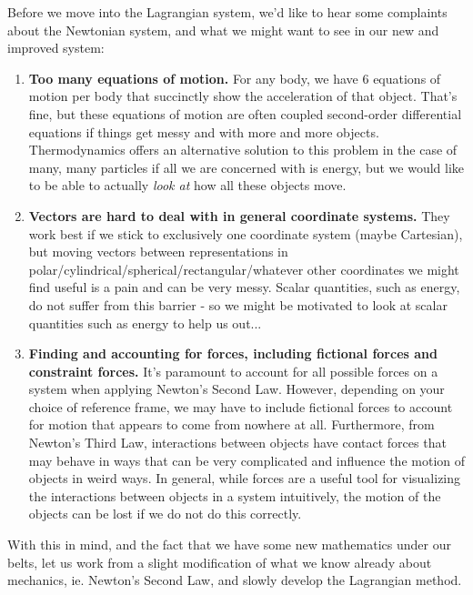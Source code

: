 Before we move into the Lagrangian system, we'd like to hear some complaints about the Newtonian system, and what we might want to see in our new and improved system: 
\begin{enumerate}
\item \textbf{Too many equations of motion.} For any body, we have $6$ equations of motion per body that succinctly show the acceleration of that object. That's fine, but these equations of motion are often coupled second-order differential equations if things get messy and with more and more objects. Thermodynamics offers an alternative solution to this problem in the case of many, many particles if all we are concerned with is energy, but we would like to be able to actually \textit{look at} how all these objects move. 

\item \textbf{Vectors are hard to deal with in general coordinate systems.} They work best if we stick to exclusively one coordinate system (maybe Cartesian), but moving vectors between representations in polar/cylindrical/spherical/rectangular/whatever other coordinates we might find useful is a pain and can be very messy. Scalar quantities, such as energy, do not suffer from this barrier - so we might be motivated to look at scalar quantities such as energy to help us out...

\item \textbf{Finding and accounting for forces, including fictional forces and constraint forces.} It's paramount to account for all possible forces on a system when applying Newton's Second Law. However, depending on your choice of reference frame, we may have to include fictional forces to account for motion that appears to come from nowhere at all. Furthermore, from Newton's Third Law, interactions between objects have contact forces that may behave in ways that can be very complicated and influence the motion of objects in weird ways. In general, while forces are a useful tool for visualizing the interactions between objects in a system intuitively, the motion of the objects can be lost if we do not do this correctly.
\end{enumerate}

With this in mind, and the fact that we have some new mathematics under our belts, let us work from a slight modification of what we know already about mechanics, ie. Newton's Second Law, and slowly develop the Lagrangian method.

